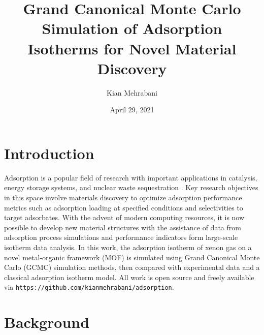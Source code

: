 \documentclass{article}
\author{Kian Mehrabani}
\date{April 29, 2021}
\title{Grand Canonical Monte Carlo Simulation of Adsorption Isotherms for Novel Material Discovery}
\begin{document}
\maketitle\newpage
\onehalfspacing

\section{Introduction}
Adsorption is a popular field of research with important applications in catalysis, energy storage systems, and nuclear waste sequestration \cite{h2-storage, sbmof-discovery}.
Key research objectives in this space involve materials discovery to optimize adsorption performance metrics such as adsorption loading at specified conditions and selectivities to target adsorbates.
With the advent of modern computing resources, it is now possible to develop new material structures with the assistance of data from adsorption process simulations and performance indicators form large-scale isotherm data analysis.
In this work, the adsorption isotherm of xenon gas on a novel metal-organic framework (MOF) is simulated using Grand Canonical Monte Carlo (GCMC) simulation methods, then compared with experimental data and a classical adsorption isotherm model. All work is open source and freely available via \texttt{https://github.com/kianmehrabani/adsorption}.

\section{Background}
\end{document}

